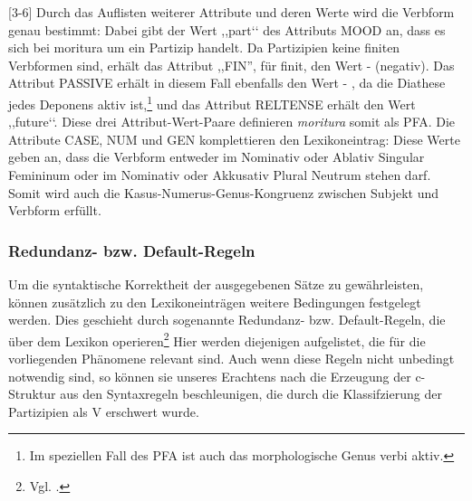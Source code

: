 \documentclass[12pt,a4paper]{article}
\begin{document}
[3-6] Durch das Auflisten weiterer Attribute und deren Werte wird die Verbform genau bestimmt: Dabei gibt der Wert ,,part‘‘ des Attributs MOOD an, dass es sich bei moritura um ein Partizip handelt. Da Partizipien keine finiten Verbformen sind, erhält das Attribut ,,FIN'', für finit, den Wert - (negativ). Das Attribut PASSIVE erhält in diesem Fall ebenfalls den Wert - , da die Diathese jedes Deponens aktiv ist,\footnote{Im speziellen Fall des PFA ist auch das morphologische Genus verbi aktiv.} und das Attribut RELTENSE erhält den Wert ,,future‘‘. Diese drei Attribut-Wert-Paare definieren \textit{moritura} somit als PFA. Die Attribute CASE, NUM und GEN komplettieren den Lexikoneintrag: Diese Werte geben an, dass die Verbform entweder im Nominativ oder Ablativ Singular Femininum oder im Nominativ oder Akkusativ Plural Neutrum stehen darf. Somit wird auch die Kasus-Numerus-Genus-Kongruenz zwischen Subjekt und Verbform erfüllt.












\subsubsection{Redundanz- bzw. Default-Regeln}
Um die syntaktische Korrektheit der ausgegebenen Sätze zu gewährleisten, können zusätzlich zu den Lexikoneinträgen weitere Bedingungen festgelegt werden. Dies geschieht durch sogenannte Redundanz- bzw. Default-Regeln, die über dem Lexikon operieren\footnote{Vgl. \cite[23-4]{Rohrer}.} Hier werden diejenigen aufgelistet, die für die vorliegenden Phänomene relevant sind. Auch wenn diese Regeln nicht unbedingt notwendig sind, so können sie unseres Erachtens nach die Erzeugung der c-Struktur aus den Syntaxregeln beschleunigen, die durch die Klassifzierung der Partizipien als V erschwert
wurde.
\end{document}
